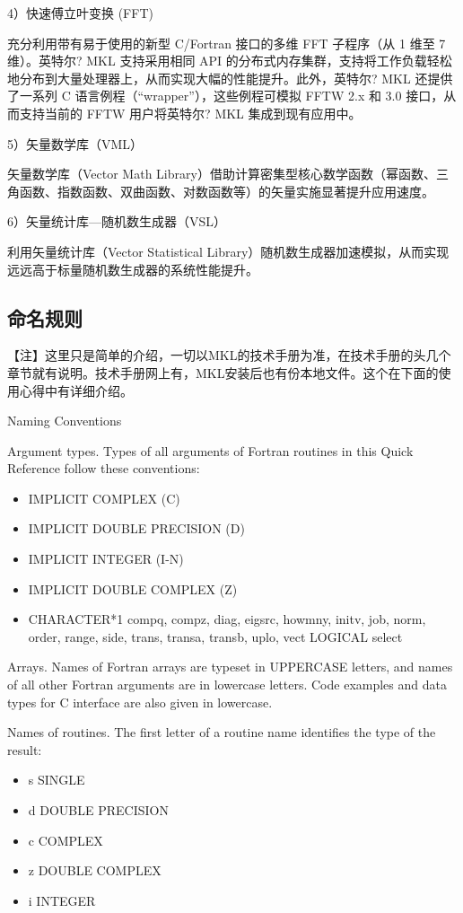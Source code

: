 4）快速傅立叶变换 (FFT)

充分利用带有易于使用的新型 C/Fortran 接口的多维 FFT 子程序（从 1 维至 7 维）。英特尔? MKL 支持采用相同 API 的分布式内存集群，支持将工作负载轻松地分布到大量处理器上，从而实现大幅的性能提升。此外，英特尔? MKL 还提供了一系列 C 语言例程（“wrapper”），这些例程可模拟 FFTW 2.x 和 3.0 接口，从而支持当前的 FFTW 用户将英特尔? MKL 集成到现有应用中。
 
5）矢量数学库（VML）

矢量数学库（Vector Math Library）借助计算密集型核心数学函数（幂函数、三角函数、指数函数、双曲函数、对数函数等）的矢量实施显著提升应用速度。
 
6）矢量统计库—随机数生成器（VSL）

利用矢量统计库（Vector Statistical Library）随机数生成器加速模拟，从而实现远远高于标量随机数生成器的系统性能提升。


\subsection{命名规则}
【注】这里只是简单的介绍，一切以MKL的技术手册为准，在技术手册的头几个章节就有说明。技术手册网上有，MKL安装后也有份本地文件。这个在下面的使用心得中有详细介绍。

Naming Conventions

Argument types. Types of all arguments of Fortran routines in this Quick Reference follow these conventions:
\begin{itemize}
\item IMPLICIT COMPLEX (C) 
\item IMPLICIT DOUBLE PRECISION (D) 
\item IMPLICIT INTEGER (I-N) 
\item IMPLICIT DOUBLE COMPLEX (Z) 
\item CHARACTER*1 compq, compz, diag, eigsrc, howmny, initv, job, norm, order, range, side, trans, transa, transb, uplo, vect 
LOGICAL select
\end{itemize}

Arrays. Names of Fortran arrays are typeset in UPPERCASE letters, and names of all other Fortran arguments are in lowercase letters. Code examples and data types for C interface are also given in lowercase.

Names of routines. The first letter of a routine name identifies the type of the result: 
\begin{itemize}
\item s    SINGLE 
\item d    DOUBLE PRECISION 
\item c    COMPLEX 
\item z    DOUBLE COMPLEX 
\item i    INTEGER
\end{itemize}


